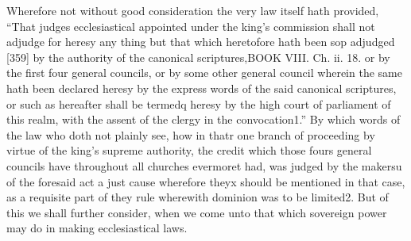 Wherefore not without good consideration the very law itself hath provided, “That judges ecclesiastical appointed under the king’s commission shall not adjudge for heresy any thing but that which heretofore hath been sop adjudged [359] by the authority of the canonical scriptures,BOOK VIII. Ch. ii. 18. or by the first four general councils, or by some other general council wherein the same hath been declared heresy by the express words of the said canonical scriptures, or such as hereafter shall be termedq heresy by the high court of parliament of this realm, with the assent of the clergy in the convocation1.” By which words of the law who doth not plainly see, how in thatr one branch of proceeding by virtue of the king’s supreme authority, the credit which those fours general councils have throughout all churches evermoret had, was judged by the makersu of the foresaid act a just cause wherefore theyx should be mentioned in that case, as a requisite part of they rule wherewith dominion was to be limited2. But of this we shall further consider, when we come unto that which sovereign power may do in making ecclesiastical laws.

